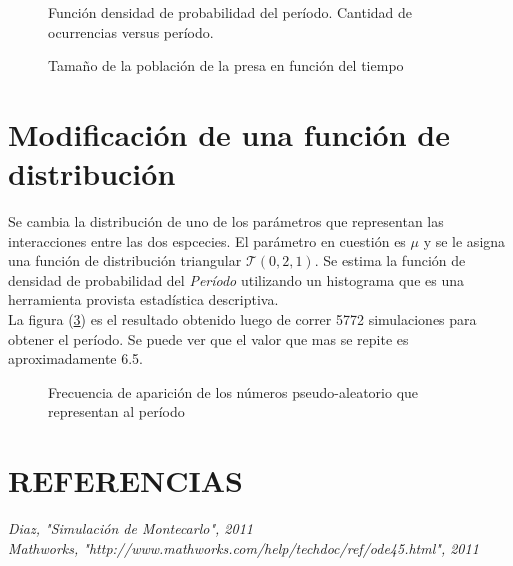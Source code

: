 \documentclass{SPANISH_acm_proc_article-sp}
\begin{document}
\begin{figure}
\centering
\label{fig:histo}
\caption{Funci\'on densidad de probabilidad del per\'iodo. Cantidad de ocurrencias versus per\'iodo.}
\end{figure}

\begin{figure}
\centering
\label{fig:presa}
\caption{Tama\~no de la poblaci\'on de la presa en funci\'on del tiempo}
\end{figure}

\section{Modificaci\'on de una funci\'on de distribuci\'on }
Se cambia la distribuci\'on de uno de los par\'ametros que representan las interacciones entre las dos espcecies.
 El par\'ametro en cuesti\'on es $\mu$ y se le asigna una funci\'on de distribuci\'on triangular $\mathcal{T}(0,2,1)$.
 Se estima la funci\'on de densidad de probabilidad del \emph{Per\'iodo} utilizando un histograma que es una herramienta provista estad\'istica descriptiva. 
 \\
 La figura (\ref{fig:histoTriangulo}) es el resultado obtenido luego de correr 5772 simulaciones para obtener el per\'iodo. Se puede ver que el valor que mas se repite es aproximadamente 6.5.


\begin{figure}
\centering
{}
\caption{Frecuencia de aparici\'on de los n\'umeros pseudo-aleatorio que representan al per\'iodo}
\label{fig:histoTriangulo}
\end{figure} 
 
\section*{REFERENCIAS}
\textit{Diaz, "Simulaci\'on de Montecarlo", 2011} \\
\textit{Mathworks, "http://www.mathworks.com/help/techdoc/ref/ode45.html", 2011}
\end{document}
